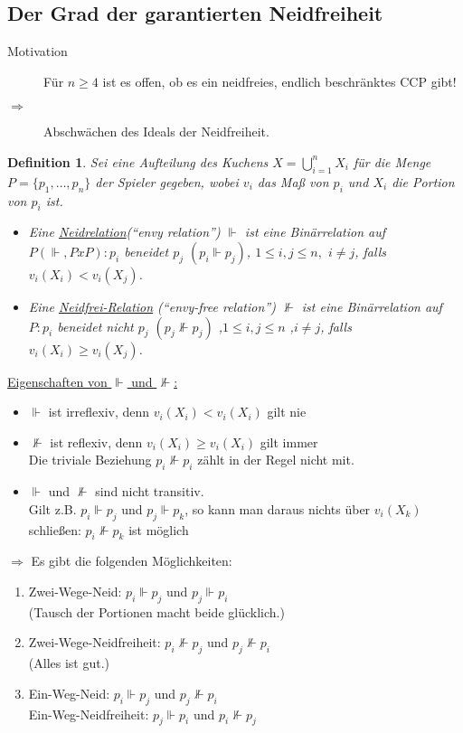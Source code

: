 \documentclass[a4paper,10pt]{scrartcl}
\newtheorem*{definition*}{Definition}
\begin{document}
\subsection{Der Grad der garantierten Neidfreiheit}
\begin{description}
 \item[Motivation] Für $n\geq4$ ist es offen, ob es ein neidfreies, endlich beschränktes CCP gibt!
 \item[$\Rightarrow$] Abschwächen des Ideals der Neidfreiheit. 
\end{description}
\begin{definition*}
 Sei eine Aufteilung des Kuchens $X=\bigcup\limits_{i=1}^n X_i$ für die Menge $P=\{p_1,\dots,p_n\}$ der Spieler gegeben, wobei $v_i$
 das Maß von $p_i$ und $X_i$ die Portion von $p_i$ ist.
 \begin{itemize}
  \item Eine \underline{Neidrelation}(``envy relation'') $\Vdash$ ist eine Binärrelation auf $P(\Vdash, PxP):p_i$ beneidet 
        $p_j$ $(p_i\Vdash p_j)$, $1\leq i,j\leq n,$ $i\neq j$, falls $v_i(X_i)<v_i(X_j)$.
  \item Eine \underline{Neidfrei-Relation} (``envy-free relation'') $\nVdash$ ist eine Binärrelation auf $P:p_i$ beneidet nicht $p_j$ $(p_j
        \nVdash p_j)$ ,$1\leq i,j\leq n$ ,$i\neq j$, falls $v_i(X_i)\geq v_i(X_j)$.
 \end{itemize}
\end{definition*}
\underline{Eigenschaften von $\Vdash$ und $\nVdash$:}
\begin{itemize}
 \item $\Vdash$ ist irreflexiv, denn $v_i(X_i)<v_i(X_i)$ gilt nie
 \item $\nVdash$ ist reflexiv, denn $v_i(X_i)\geq v_i(X_i)$ gilt immer\\Die triviale Beziehung $p_i \nVdash p_i$ zählt in der Regel nicht
       mit.
 \item $\Vdash$ und $\nVdash$ sind nicht transitiv.\\
       Gilt z.B. $p_i\Vdash p_j$ und $p_j\Vdash p_k$, so kann man daraus nichts über $v_i(X_k)$ schließen: $p_i\nVdash p_k$ ist möglich
\end{itemize}
$\Rightarrow$ Es gibt die folgenden Möglichkeiten:
\begin{enumerate}
 \item Zwei-Wege-Neid: $p_i\Vdash p_j$ und $p_j\Vdash p_i$\\(Tausch der Portionen macht beide glücklich.)
 \item Zwei-Wege-Neidfreiheit: $p_i\nVdash p_j$ und $p_j\nVdash p_i$\\(Alles ist gut.)
 \item Ein-Weg-Neid: $p_i\Vdash p_j$ und $p_j\nVdash p_i$\\
       Ein-Weg-Neidfreiheit: $p_j\Vdash p_i$ und $p_i\nVdash p_j$
\end{enumerate}
\end{document}
